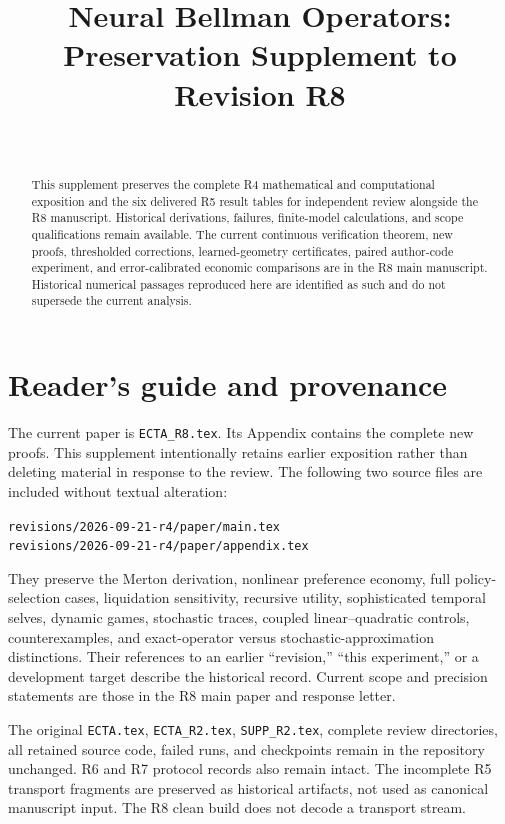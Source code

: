\documentclass[ecta]{econsocart}
\renewcommand{\[}{\begingroup\small\ROpenDisplay}
\renewcommand{\]}{\RCloseDisplay\endgroup}
\theoremstyle{remark}
\begin{document}
\begin{frontmatter}
\title{Neural Bellman Operators: Preservation Supplement to Revision R8}
\begin{aug}
\author[id=au1,addressref={add1}]{~}
\address[id=add1]{}
\end{aug}
\begin{abstract}
This supplement preserves the complete R4 mathematical and computational exposition and the six delivered R5 result tables for independent review alongside the R8 manuscript. Historical derivations, failures, finite-model calculations, and scope qualifications remain available. The current continuous verification theorem, new proofs, thresholded corrections, learned-geometry certificates, paired author-code experiment, and error-calibrated economic comparisons are in the R8 main manuscript. Historical numerical passages reproduced here are identified as such and do not supersede the current analysis.
\end{abstract}
\end{frontmatter}
\section*{Reader's guide and provenance}
The current paper is \texttt{ECTA\_R8.tex}. Its Appendix contains the complete new proofs. This supplement intentionally retains earlier exposition rather than deleting material in response to the review. The following two source files are included without textual alteration:
\begin{center}\small
\texttt{revisions/2026-09-21-r4/paper/main.tex}\\
\texttt{revisions/2026-09-21-r4/paper/appendix.tex}
\end{center}
They preserve the Merton derivation, nonlinear preference economy, full policy-selection cases, liquidation sensitivity, recursive utility, sophisticated temporal selves, dynamic games, stochastic traces, coupled linear--quadratic controls, counterexamples, and exact-operator versus stochastic-approximation distinctions. Their references to an earlier ``revision,'' ``this experiment,'' or a development target describe the historical record. Current scope and precision statements are those in the R8 main paper and response letter.

The original \texttt{ECTA.tex}, \texttt{ECTA\_R2.tex}, \texttt{SUPP\_R2.tex}, complete review directories, all retained source code, failed runs, and checkpoints remain in the repository unchanged. R6 and R7 protocol records also remain intact. The incomplete R5 transport fragments are preserved as historical artifacts, not used as canonical manuscript input. The R8 clean build does not decode a transport stream.
\end{document}
